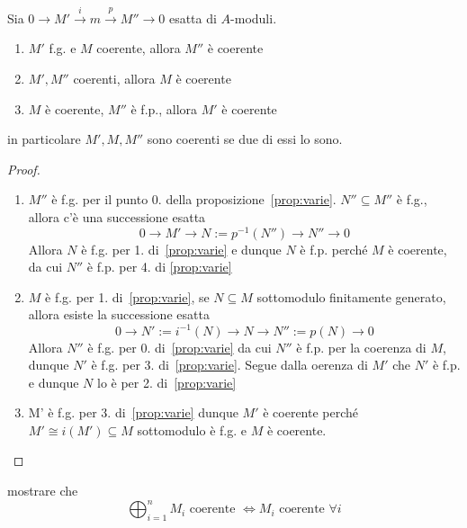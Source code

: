 \begin{proposition}{}
    Sia \(0 \to M' \overset{i}{\to } m \overset{p}{\to } M'' \to 0\) esatta di
    \(A\)-moduli.
\begin{enumerate}[label = \arabic*.]
    \item \(M'\) f.g. e \(M\) coerente, allora \(M''\) è coerente
    \item \(M', M''\) coerenti, allora \(M\) è coerente
    \item \(M\) è coerente, \(M''\) è f.p., allora \(M'\) è coerente
\end{enumerate}
in particolare \(M', M, M''\) sono coerenti se due di essi lo sono.
\end{proposition}
\begin{proof}{}
\begin{enumerate}[label = \arabic*.]
    \item \(M''\) è f.g. per il punto 0. della proposizione~\ref{prop:varie}.
        \(N'' \subseteq M'' \)  è f.g., allora c'è una successione esatta
        \[
          0 \to M' \to N := p^{-1}{(N'')} \to N'' \to 0
        \]
        Allora \(N\) è f.g. per 1. di~\ref{prop:varie} e dunque \(N\) è f.p.
        perché \(M\) è coerente, da cui \(N''\) è f.p. per 4. di \ref{prop:varie}
    \item \(M\) è f.g. per 1. di~\ref{prop:varie}, se \(N \subseteq M \)
        sottomodulo finitamente generato, allora esiste la successione esatta
        \[
          0 \to N' := i^{-1}{(N)} \to N \to N'' := p{(N)} \to 0
        \]
        Allora \(N''\) è f.g. per 0. di~\ref{prop:varie} da cui \(N''\) è f.p.
        per la coerenza di \(M\), dunque \(N'\) è f.g. per 3. di~\ref{prop:varie}. Segue dalla oerenza di \(M'\) che \(N'\) è f.p. e dunque \(N\) lo è per 2. di~\ref{prop:varie}
    \item M' è f.g. per 3. di~\ref{prop:varie} dunque \(M'\) è coerente perché
        \(M' \cong i{(M')} \subseteq M \) sottomodulo è f.g. e \(M\) è coerente.
\end{enumerate}
\end{proof}
\begin{eser}{}
    mostrare che
    \[
      \bigoplus_{i=1} ^{n} M_i \text{ coerente } \iff M_{i} \text{ coerente } \forall i
    \]
\end{eser}

